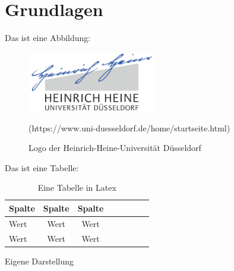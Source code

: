\newpage
\section{Grundlagen} \label{sec:grundlagen}

Das ist eine Abbildung: 
\begin{figure}[h]
	\centering
	\includegraphics[width=0.5\textwidth]{Grafiken/hhulogo.png}
	\caption{Logo der Heinrich-Heine-Universität Düsseldorf}
	\quelle (https://www.uni-duesseldorf.de/home/startseite.html)
	\label{img:hhulogo}
\end{figure}

Das ist eine Tabelle: 
\begin{table}[h]
\centering
\begin{tabular}{l*{6}{c}r}
Spalte  & Spalte & Spalte \\
\hline
Wert & Wert & Wert  \\
Wert  & Wert & Wert 
\end{tabular}
\caption{Eine Tabelle in Latex}
\quelle Eigene Darstellung
\label{table:tabelle}
\end{table}
